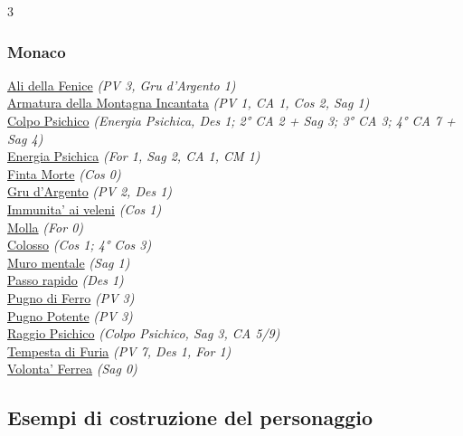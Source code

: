 \begin{multicols}{3}
{\begin{flushleft}
\titlespacing*{\subsubsection}{0pt}{0.5em}{0.5em}\subsubsection*{Monaco}

\hyperlink{Ali della Fenice}{Ali della Fenice} \textit{(PV 3, Gru d'Argento 1)}\\
\hyperlink{Armatura della Montagna Incantata}{Armatura della Montagna Incantata} \textit{(PV 1, CA 1, Cos 2, Sag 1)}\\
\hyperlink{Colpo Psichico}{Colpo Psichico} \textit{(Energia Psichica, Des 1; 2° CA 2 + Sag 3; 3° CA 3; 4° CA 7 + Sag 4)}\\
\hyperlink{Energia Psichica}{Energia Psichica} \textit{(For 1, Sag 2, CA 1, CM 1)}\\
\hyperlink{Finta Morte}{Finta Morte} \textit{(Cos 0)}\\
\hyperlink{Gru d'Argento}{Gru d'Argento} \textit{(PV 2, Des 1)}\\
\hyperlink{Immunita' ai veleni}{Immunita' ai veleni} \textit{(Cos 1)}\\
\hyperlink{Molla}{Molla} \textit{(For 0)}\\
\hyperlink{Colosso}{Colosso} \textit{(Cos 1; 4° Cos 3)}\\
\hyperlink{Muro mentale}{Muro mentale} \textit{(Sag 1)}\\
\hyperlink{Passo rapido}{Passo rapido} \textit{(Des 1)}\\
\hyperlink{Pugno di Ferro}{Pugno di Ferro} \textit{(PV 3)}\\
\hyperlink{Pugno Potente}{Pugno Potente} \textit{(PV 3)}\\
\hyperlink{Raggio Psichico}{Raggio Psichico} \textit{(Colpo Psichico, Sag 3, CA 5/9)}\\
\hyperlink{Tempesta di Furia}{Tempesta di Furia} \textit{(PV 7, Des 1, For 1)}\\
\hyperlink{Volonta' Ferrea}{Volonta' Ferrea} \textit{(Sag 0)}\\

\end{flushleft}
}

\end{multicols}



\subsection{Esempi di costruzione del personaggio}

